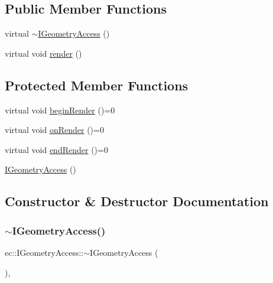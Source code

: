 \subsection*{Public Member Functions}
\begin{DoxyCompactItemize}
\item 
virtual \mbox{\hyperlink{classec_1_1_i_geometry_access_a786b4a8489f1c7fd6c4c2685fc53e7dc}{$\sim$\+I\+Geometry\+Access}} ()
\item 
virtual void \mbox{\hyperlink{classec_1_1_i_geometry_access_a9b6eaf56646bc2b5aa29385aaba02c7d}{render}} ()
\end{DoxyCompactItemize}
\subsection*{Protected Member Functions}
\begin{DoxyCompactItemize}
\item 
virtual void \mbox{\hyperlink{classec_1_1_i_geometry_access_a17a87aca44e2a23a6185e78262e02652}{begin\+Render}} ()=0
\item 
virtual void \mbox{\hyperlink{classec_1_1_i_geometry_access_a2ee418c9fa4eb266347bae2f0ef8095b}{on\+Render}} ()=0
\item 
virtual void \mbox{\hyperlink{classec_1_1_i_geometry_access_a6d3b9c34a8b73aeac26663ef349ce41f}{end\+Render}} ()=0
\item 
\mbox{\hyperlink{classec_1_1_i_geometry_access_aaf9faa0f583e89aa0b27db7cecbb7c6e}{I\+Geometry\+Access}} ()
\end{DoxyCompactItemize}


\subsection{Constructor \& Destructor Documentation}
\mbox{\label{classec_1_1_i_geometry_access_a786b4a8489f1c7fd6c4c2685fc53e7dc}} 
\subsubsection{\texorpdfstring{$\sim$\+I\+Geometry\+Access()}{~IGeometryAccess()}}
{\footnotesize\ttfamily ec\+::\+I\+Geometry\+Access\+::$\sim$\+I\+Geometry\+Access (\begin{DoxyParamCaption}{ }\end{DoxyParamCaption})\hspace{0.3cm}{\ttfamily [virtual]}, {\ttfamily [default]}}

